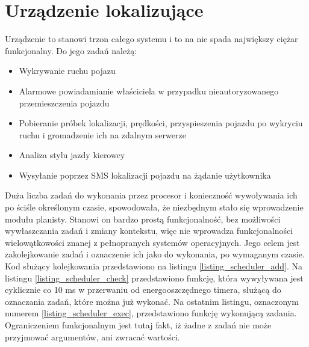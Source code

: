 \section{Urządzenie lokalizujące}
\lstset{language=C}

Urządzenie to stanowi trzon całego systemu i to na nie spada największy ciężar funkcjonalny. Do jego zadań należą:

\begin{itemize}
\item Wykrywanie ruchu pojazu
\item Alarmowe powiadamianie właściciela w przypadku nieautoryzowanego przemieszczenia pojazdu
\item Pobieranie próbek lokalizacji, prędkości, przyspieszenia pojazdu po wykryciu ruchu i gromadzenie ich na zdalnym serwerze
\item Analiza stylu jazdy kierowcy
\item Wysyłanie poprzez SMS lokalizacji pojazdu na żądanie użytkownika
\end{itemize}

Duża liczba zadań do wykonania przez procesor i konieczność wywoływania ich po ściśle określonym czasie, spowodowała, że niezbędnym stało się wprowadzenie modułu planisty. Stanowi on bardzo prostą funkcjonalność, bez możliwości wywłaszczania zadań i zmiany kontekstu, więc nie wprowadza funkcjonalności wielowątkowości znanej z pełnopranych systemów operacyjnych. Jego celem jest zakolejkowanie zadań i oznaczenie ich jako do wykonania, po wymaganym czasie. Kod służący kolejkowania przedstawiono na listingu \ref{listing_scheduler_add}. Na listingu \ref{listing_scheduler_check} przedstawiono funkcję, która wywyływana jest cyklicznie co 10 ms w przerwaniu od energooszczędnego timera, służącą do oznaczania zadań, które można już wykonać. Na ostatnim listingu, oznaczonym numerem  \ref{listing_scheduler_exec}, przedstawiono funkcję wykonującą zadania. Ograniczeniem funkcjonalnym jest tutaj fakt, iż żadne z zadań nie może przyjmować argumentów, ani zwracać wartości. 
\clearpage

